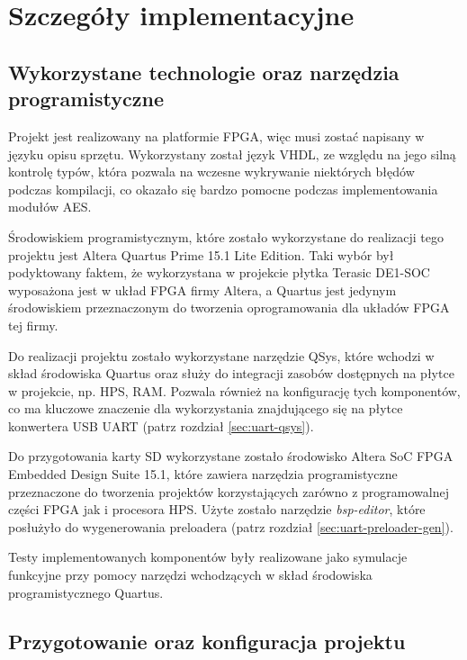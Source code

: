 \section{Szczegóły implementacyjne}
\label{sec:szczegoly-implementacyjne}

\subsection{Wykorzystane technologie oraz narzędzia programistyczne}
Projekt jest realizowany na platformie FPGA, więc musi zostać napisany w języku opisu sprzętu. Wykorzystany został język VHDL, ze względu na jego silną kontrolę typów, która pozwala na wczesne wykrywanie niektórych błędów podczas kompilacji, co okazało się bardzo pomocne podczas implementowania modułów AES.

Środowiskiem programistycznym, które zostało wykorzystane do realizacji tego projektu jest Altera Quartus Prime 15.1 Lite Edition. Taki wybór był podyktowany faktem, że wykorzystana w projekcie płytka Terasic DE1-SOC wyposażona jest w układ FPGA firmy Altera, a Quartus jest jedynym środowiskiem przeznaczonym do tworzenia oprogramowania dla układów FPGA tej firmy.

Do realizacji projektu zostało wykorzystane narzędzie QSys, które wchodzi w skład środowiska Quartus oraz służy do integracji zasobów dostępnych na płytce w projekcie, np. HPS, RAM. Pozwala również na konfigurację tych komponentów, co ma kluczowe znaczenie dla wykorzystania znajdującego się na płytce konwertera USB UART (patrz rozdział \ref{sec:uart-qsys}).

Do przygotowania karty SD wykorzystane zostało środowisko Altera SoC FPGA Embedded Design Suite 15.1, które zawiera narzędzia programistyczne przeznaczone do tworzenia projektów korzystających zarówno z programowalnej części FPGA jak i procesora HPS. Użyte zostało narzędzie \textit{bsp-editor}, które posłużyło do wygenerowania preloadera (patrz rozdział \ref{sec:uart-preloader-gen}).

Testy implementowanych komponentów były realizowane jako symulacje funkcyjne przy pomocy narzędzi wchodzących w skład środowiska programistycznego Quartus.


\subsection{Przygotowanie oraz konfiguracja projektu}

